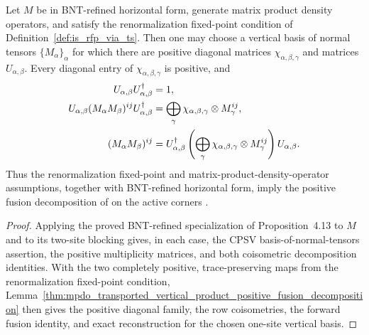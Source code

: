 \begin{theorem}
    \label{thm:mpdo_vertical_product_positive_fusion_decomposition}
    \leanok
    Let $M$ be in BNT-refined horizontal form, generate matrix
    product density operators, and satisfy the renormalization fixed-point condition of
    Definition~\ref{def:is_rfp_via_ts}. Then one may choose a vertical basis
    of normal tensors $\{M_\alpha\}_\alpha$ for which there are positive
    diagonal matrices $\chi_{\alpha,\beta,\gamma}$ and matrices
    $U_{\alpha,\beta}$. Every diagonal entry of
    $\chi_{\alpha,\beta,\gamma}$ is positive, and
    \begin{align}
        U_{\alpha,\beta}U_{\alpha,\beta}^{\dagger}
         & =1,
        \notag                         \\
        U_{\alpha,\beta}(M_\alpha M_\beta)^{ij}
        U_{\alpha,\beta}^{\dagger}
         & =\bigoplus_\gamma
        \chi_{\alpha,\beta,\gamma}\otimes M_\gamma^{ij},
        \notag                         \\
        (M_\alpha M_\beta)^{ij}
         & =U_{\alpha,\beta}^{\dagger}
        \left(\bigoplus_\gamma
        \chi_{\alpha,\beta,\gamma}\otimes M_\gamma^{ij}\right)
        U_{\alpha,\beta}.
        \notag
    \end{align}
    Thus the renormalization fixed-point and matrix-product-density-operator
    assumptions, together with BNT-refined horizontal form, imply
    the positive fusion decomposition of
    \cite[Appendix~C.4, lines~2020--2029]{Cirac2016MPDO_arXiv} on the active
    corners \cite{gap:cpsv16_bnt_uniqueness_zero_coefficient,
        gap:cpsv16_figure11_per_pair_support, gap:cpsv16_figure11_fusion_coisometry}.
\end{theorem}

\begin{proof}\leanok
    Applying the proved BNT-refined specialization of
    Proposition~4.13 to $M$ and to its two-site blocking gives, in each case,
    the CPSV basis-of-normal-tensors assertion, the positive multiplicity
    matrices, and both coisometric decomposition identities.
    With the two completely positive, trace-preserving maps from the
    renormalization fixed-point condition,
    Lemma~\ref{thm:mpdo_transported_vertical_product_positive_fusion_decomposition}
    then gives the positive diagonal family, the row
    coisometries, the forward fusion identity, and exact reconstruction for
    the chosen one-site vertical basis.
\end{proof}

